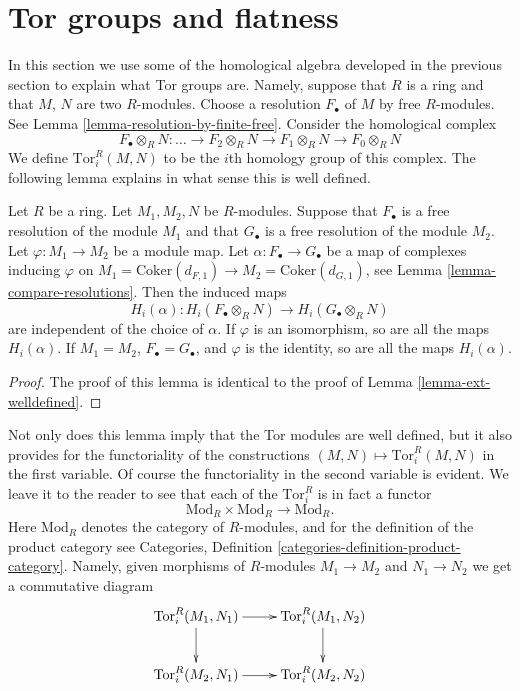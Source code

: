 \section{Tor groups and flatness}
\label{section-tor}

\noindent
In this section we use some of the homological algebra
developed in the previous section to explain what
Tor groups are. Namely, suppose that $R$ is a ring
and that $M$, $N$ are two $R$-modules. Choose
a resolution $F_\bullet$ of $M$ by free $R$-modules.
See Lemma \ref{lemma-resolution-by-finite-free}.
Consider the homological complex
$$
F_\bullet \otimes_R N
:
\ldots 
\to F_2 \otimes_R N 
\to F_1 \otimes_R N 
\to F_0 \otimes_R N 
$$
We define $\text{Tor}^R_i(M, N)$ to be the $i$th homology
group of this complex. The following lemma explains in
what sense this is well defined.

\begin{lemma}
\label{lemma-tor-welldefined}
Let $R$ be a ring. Let $M_1, M_2, N$ be $R$-modules.
Suppose that $F_\bullet$ is a free resolution of
the module $M_1$ and that $G_\bullet$ is a free
resolution of the module $M_2$. Let $\varphi : M_1 \to M_2$
be a module map. Let $\alpha : F_\bullet \to G_\bullet$
be a map of complexes inducing $\varphi$ on
$M_1 = \text{Coker}(d_{F,1}) \to M_2 = \text{Coker}(d_{G,1})$,
see Lemma \ref{lemma-compare-resolutions}.
Then the induced maps
$$
H_i(\alpha) :
H_i(F_\bullet \otimes_R N)
\longrightarrow
H_i(G_\bullet \otimes_R N)
$$
are independent of the choice of $\alpha$. If $\varphi$
is an isomorphism, so are all the maps $H_i(\alpha)$.
If $M_1 = M_2$, $F_\bullet = G_\bullet$, and
$\varphi$ is the identity, so are all the maps $H_i(\alpha)$.
\end{lemma}

\begin{proof}
The proof of this lemma is identical to the proof of Lemma
\ref{lemma-ext-welldefined}.
\end{proof}

\noindent
Not only does this lemma imply that the Tor modules are well defined,
but it also provides for the functoriality of the constructions
$(M, N) \mapsto \text{Tor}_i^R(M, N)$ in the first variable. Of course
the functoriality in the second variable is evident. We leave it to
the reader to see that each of the $\text{Tor}_i^R$ is in fact
a functor
$$
\text{Mod}_R \times \text{Mod}_R \to \text{Mod}_R.
$$
Here $\text{Mod}_R$ denotes the category of $R$-modules, and
for the definition of the product category
see Categories, Definition \ref{categories-definition-product-category}.
Namely, given morphisms of $R$-modules $M_1 \to M_2$
and $N_1 \to N_2$ we get a commutative diagram
$$
\xymatrix{
\text{Tor}_i^R(M_1, N_1) \ar[r] \ar[d] &
\text{Tor}_i^R(M_1, N_2) \ar[d] \cr
\text{Tor}_i^R(M_2, N_1) \ar[r] &
\text{Tor}_i^R(M_2, N_2) \cr
}
$$


